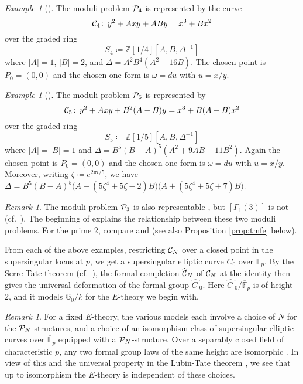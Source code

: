 \documentclass{gtpart}
\theoremstyle{definition}
\theoremstyle{remark}
\newtheorem{rmk}[equation]{Remark}
\newtheorem{ex}[equation]{Example}
\def\co{\colon\thinspace}
\newcommand{\mb}[1]{\mathbb{#1}}
\newcommand{\cF}{\overline {\mb F}}
\newcommand{\CC}{{\cal C}}
\newcommand{\CP}{{\cal P}}
\newcommand{\BG}{{\mb G}}
\newcommand{\BZ}{{\mb Z}}
\newcommand{\HC}{\widehat{C~}\!}
\newcommand{\HCC}{\widehat{~\!\!\CC}}
\renewcommand{\D}{\Delta}
\newcommand{\G}{\Gamma}
\renewcommand{\o}{\omega}
\newcommand{\ce}{\coloneqq}
\renewcommand{\=}{\approx}
\renewcommand{\-}{\sim}
\numberwithin{equation}{section}
\begin{document}
\begin{ex}[{\cite[Proposition 2.1]{p3}}]
 \label{ex:4}
 The moduli problem $\CP_4$ is represented by the curve 
 \[
  \CC_4 \co y^2 + A x y + A B y = x^3 + B x^2 
 \]
 over the graded ring 
 \[
  S_4 \ce \BZ[1/4][A, B, \D^{-1}] 
 \]
 where $|A| = 1$, $|B| = 2$, and $\D = A^2 B^4 (A^2 - 16 B)$.  The chosen point 
 is $P_0 = (0,0)$ and the chosen one-form is $\o = du$ with $u = x / y$.  
\end{ex}

\begin{ex}[{\cite[Corollary 1.1.10]{tmf5}}]
 \label{ex:5}
 The moduli problem $\CP_5$ is represented by 
 \[
  \CC_5 \co y^2 + A x y + B^2 (A - B) y = x^3 + B (A - B) x^2 
 \]
 over the graded ring 
 \[
  S_5 \ce \BZ[1/5][A, B, \D^{-1}] 
 \]
 where $|A| = |B| = 1$ and $\D = B^5 (B - A)^5 (A^2 + 9 A B - 11 B^2)$.  Again 
 the chosen point is $P_0 = (0,0)$ and the chosen one-form is $\o = du$ with 
 $u = x / y$.  Moreover, writing $\zeta \ce e^{2 \pi i / 5}$, we have $\D = B^5 
 (B - A)^5 \big( A - (5 \zeta^4 + 5 \zeta - 2) B \big) \big( A + (5 \zeta^4 + 5 
 \zeta + 7) B \big)$.  
\end{ex}

\begin{rmk}
 \label{rmk:tmf3}
 The moduli problem $\CP_3$ is also representable \cite[Proposition 3.2]{tmf3}, 
 but $[\G_1(3)]$ is not (cf.~\cite[Corollary 2.7.4]{KM}).  The beginning of 
 \cite[Section 1]{tmf5} explains the relationship between these two moduli 
 problems.  For the prime 2, compare \cite[Corollary 1.1.11]{tmf5} and 
 \cite[Section 3.1]{level3II} (see also Proposition \ref{prop:tmfe} below).  
\end{rmk}

From each of the above examples, restricting $\CC_N$ over a closed point in the 
supersingular locus at $p$, we get a supersingular elliptic curve $C_0$ over 
$\cF_p$.  By the Serre-Tate theorem \cite{LST} (cf.~\cite[Theorem 2.9.1]{KM}), 
the formal completion $\HCC_N$ of $\CC_N$ at the identity then gives the 
universal deformation of the formal group $\HC_0$.  Here $\HC_0 / \cF_p$ is of 
height 2, and it models $\BG_0 / k$ for the $E$-theory we begin with.  

\begin{rmk}
 \label{rmk:N}
 For a fixed $E$-theory, the various models each involve a choice of $N$ for the 
 $\CP_N$-structures, and a choice of an isomorphism class of supersingular 
 elliptic curves over $\cF_p$ equipped with a $\CP_N$-structure.  Over a 
 separably closed field of characteristic $p$, any two formal group laws of the 
 same height are isomorphic \cite[Th\'eor\`eme IV]{Lazard}.  In view of this and 
 the universal property in the Lubin-Tate theorem \cite[Theorem 3.1]{LT}, we see 
 that up to isomorphism the $E$-theory is independent of these choices.  
\end{rmk}
\end{document}
